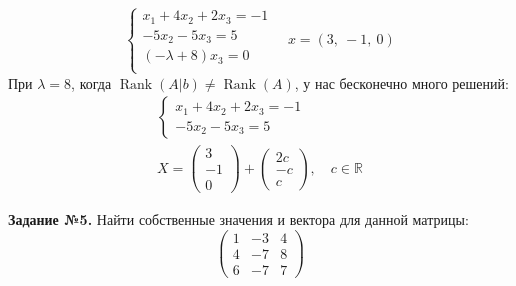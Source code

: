 \documentclass[a4paper, 12pt]{article}
\DeclareMathOperator{\Rank}{Rank}
\begin{document}
\[
\begin{cases}
    x_1 + 4x_2 + 2x_3 = -1 \\ 
    -5x_2 - 5x_3 = 5 \\ 
    (-\lambda + 8)x_3 = 0 \\ 
\end{cases} \quad x = (3, \ -1, \ 0)
\]
При $\lambda = 8$, когда $\Rank{(A|b)} \ne \Rank{(A)}$, у нас бесконечно много решений:
\begin{gather*}    
    \begin{cases}
        x_1 + 4x_2 + 2x_3 = -1 \\ 
        -5x_2 - 5x_3 = 5 
    \end{cases} \\ 
    X = 
    \begin{pmatrix}
        3 \\ 
        -1 \\ 
        0
    \end{pmatrix} +
    \begin{pmatrix}
        2c \\ 
        -c \\ 
        c
    \end{pmatrix}, \quad c \in \mathbb{R}
\end{gather*}

\newpage 

\textbf{Задание №5.} Найти собственные значения и вектора для данной матрицы:
\[
\begin{pmatrix}
    1 & -3 & 4 \\ 
    4 & -7 & 8 \\ 
    6 & -7 & 7
\end{pmatrix}
\]

\vspace{0.5cm}
\end{document}
